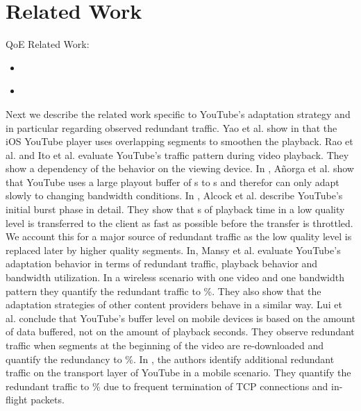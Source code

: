 
\section{Related Work}
\label{sec:relatedwork}

QoE Related Work:

\begin{itemize}
\item \cite{casas2012youtube}
\item \cite{sieber16sacrificing,sieber15costaggressive}
\end{itemize}

Next we describe the related work specific to YouTube's adaptation strategy and in particular regarding observed redundant traffic.
Yao et al. show in \cite{Yao2014b} that the iOS YouTube player uses overlapping segments to smoothen the playback.
Rao et al. \cite{rao2011network} and Ito et al. \cite{ito14networklevel} evaluate YouTube's traffic pattern during video playback. They show a dependency of the behavior on the viewing device.
In \cite{Anorga2015}, A\~norga et al. show that YouTube uses a large playout buffer of \unit[13]{s} to \unit[40]{s} and therefor can only adapt slowly to changing bandwidth conditions.
In \cite{alcock11application}, Alcock et al. describe YouTube's initial burst phase in detail. They show that \unit[32]{s} of playback time in a low quality level is transferred to the client as fast as possible before the transfer is throttled. We account this for a major source of redundant traffic as the low quality level is replaced later by higher quality segments.
In, \cite{Mansy2014} Mansy et al. evaluate YouTube's adaptation behavior in terms of redundant traffic, playback behavior and bandwidth utilization. In a wireless scenario with one video and one bandwidth pattern they quantify the redundant traffic to \unit[16]{\%}. They also show that the adaptation strategies of other content providers behave in a similar way.
Lui et al. \cite{liu2013comparative} conclude that YouTube's buffer level on mobile devices is based on the amount of data buffered, not on the amount of playback seconds. They observe redundant traffic when segments at the beginning of the video are re-downloaded and quantify the redundancy to \unit[15]{\%}.
In \cite{nam2013mobile}, the authors identify additional redundant traffic on the transport layer of YouTube in a mobile scenario. They quantify the redundant traffic to \unit[35]{\%} due to frequent termination of TCP connections and in-flight packets.
